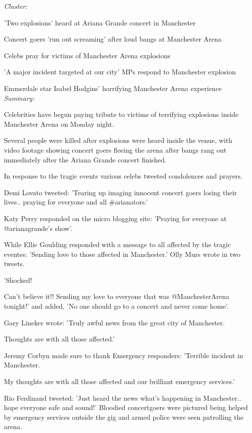 \documentclass[12pt]{article}
\begin{document}
\emph{Cluster:}

'Two explosions' heard at Ariana Grande concert in Manchester

Concert goers 'run out screaming' after loud bangs at Manchester Arena

Celebs pray for victims of Manchester Arena explosions

'A major incident targeted at our city' MPs respond to Manchester explosion

Emmerdale star Isabel Hodgins' horrifying Manchester Arena experience \\

\emph{Summary:}

Celebrities have begun paying tribute to victims of terrifying explosions inside Manchester Arena on Monday night.

Several people were killed after explosions were heard inside the venue, with video footage showing concert goers fleeing the arena after bangs rang out immediately after the Ariana Grande concert finished.

In response to the tragic events various celebs tweeted condolences and prayers.

Demi Lovato tweeted: 'Tearing up imaging innocent concert goers losing their lives.. praying for everyone and all \#arianators.'

Katy Perry responded on the micro blogging site: 'Praying for everyone at @arianagrande's show'.

While Ellie Goulding responded with a message to all affected by the tragic eventes: 'Sending love to those affected in Manchester.' Olly Murs wrote in two tweets.

'Shocked!

Can't believe it!! Sending my love to everyone that was @ManchesterArena tonight!' and added, 'No one should go to a concert and never come home'.

Gary Lineker wrote: 'Truly awful news from the great city of Manchester.

Thoughts are with all those affected.'

Jeremy Corbyn made sure to thank Emergency responders: 'Terrible incident in Manchester.

My thoughts are with all those affected and our brilliant emergency services.'

Rio Ferdinand tweeted: 'Just heard the news what's happening in Manchester.. hope everyone safe and sound!' Bloodied concertgoers were pictured being helped by emergency services outside the gig and armed police were seen patrolling the arena.
\end{document}
